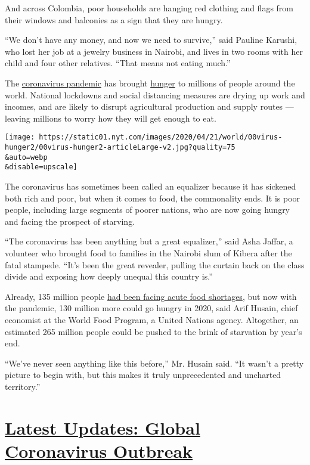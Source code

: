 And across Colombia, poor households are hanging red clothing and flags
from their windows and balconies as a sign that they are hungry.

``We don't have any money, and now we need to survive,'' said Pauline
Karushi, who lost her job at a jewelry business in Nairobi, and lives in
two rooms with her child and four other relatives. ``That means not
eating much.''

The
\href{https://www.nytimes.com/2020/05/13/us/politics/coronavirus-hunger-food-banks.html}{coronavirus
pandemic} has brought
\href{https://www.nytimes.com/2020/05/13/us/politics/coronavirus-hunger-food-banks.html}{hunger}
to millions of people around the world. National lockdowns and social
distancing measures are drying up work and incomes, and are likely to
disrupt agricultural production and supply routes --- leaving millions
to worry how they will get enough to eat.

\texttt{[image: https://static01.nyt.com/images/2020/04/21/world/00virus-hunger2/00virus-hunger2-articleLarge-v2.jpg?quality=75\\\&auto=webp\\\&disable=upscale]}

The coronavirus has sometimes been called an equalizer because it has
sickened both rich and poor, but when it comes to food, the commonality
ends. It is poor people, including large segments of poorer nations, who
are now going hungry and facing the prospect of starving.

``The coronavirus has been anything but a great equalizer,'' said Asha
Jaffar, a volunteer who brought food to families in the Nairobi slum of
Kibera after the fatal stampede. ``It's been the great revealer, pulling
the curtain back on the class divide and exposing how deeply unequal
this country is.''

Already, 135 million people
\href{https://www.fsinplatform.org/sites/default/files/resources/files/GRFC_2020_ONLINE_200420.pdf}{had
been facing acute food shortages}, but now with the pandemic, 130
million more could go hungry in 2020, said Arif Husain, chief economist
at the World Food Program, a United Nations agency. Altogether, an
estimated 265 million people could be pushed to the brink of starvation
by year's end.

``We've never seen anything like this before,'' Mr. Husain said. ``It
wasn't a pretty picture to begin with, but this makes it truly
unprecedented and uncharted territory.''

\hypertarget{latest-updates-global-coronavirus-outbreak}{%
\section{\texorpdfstring{\href{https://www.nytimes.com/2020/08/04/world/coronavirus-covid-19.html?action=click\&pgtype=Article\&state=default\&region=MAIN_CONTENT_1\&context=storylines_live_updates}{Latest
Updates: Global Coronavirus
Outbreak}}{Latest Updates: Global Coronavirus Outbreak}}\label{latest-updates-global-coronavirus-outbreak}}


